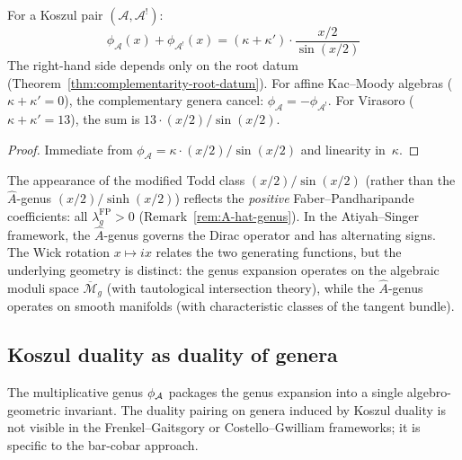 \begin{corollary}
\label{cor:complementary-genera}
For a Koszul pair $(\mathcal{A}, \mathcal{A}^!)$:
\begin{equation}\label{eq:genus-complementarity}
\phi_{\mathcal{A}}(x) + \phi_{\mathcal{A}^!}(x) = (\kappa + \kappa') \cdot \frac{x/2}{\sin(x/2)}
\end{equation}
The right-hand side depends only on the root datum \textup{(}Theorem~\textup{\ref{thm:complementarity-root-datum})}.  For affine Kac--Moody algebras \textup{(}$\kappa + \kappa' = 0$\textup{)}, the complementary genera cancel: $\phi_{\mathcal{A}} = -\phi_{\mathcal{A}^!}$.  For Virasoro \textup{(}$\kappa + \kappa' = 13$\textup{)}, the sum is $13 \cdot (x/2)/\sin(x/2)$.
\end{corollary}

\begin{proof}
Immediate from $\phi_{\mathcal{A}} = \kappa \cdot (x/2)/\sin(x/2)$ and linearity in~$\kappa$.
\end{proof}

\begin{remark}\label{rem:genus-index-theory}
The appearance of the modified Todd class $(x/2)/\sin(x/2)$ (rather than the $\hat{A}$-genus $(x/2)/\sinh(x/2)$) reflects the \emph{positive} Faber--Pandharipande coefficients: all $\lambda_g^{\mathrm{FP}} > 0$ (Remark~\ref{rem:A-hat-genus}).  In the Atiyah--Singer framework, the $\hat{A}$-genus governs the Dirac operator and has alternating signs.  The Wick rotation $x \mapsto ix$ relates the two generating functions, but the underlying geometry is distinct: the genus expansion operates on the algebraic moduli space $\overline{\mathcal{M}}_g$ (with tautological intersection theory), while the $\hat{A}$-genus operates on smooth manifolds (with characteristic classes of the tangent bundle).
\end{remark}

\subsection{Koszul duality as duality of genera}\label{subsec:koszul-genera-duality}

The multiplicative genus $\phi_{\mathcal{A}}$ packages the genus expansion into a single
algebro-geometric invariant.  The duality pairing on genera induced by Koszul duality is not visible in the Frenkel--Gaitsgory or Costello--Gwilliam frameworks; it is specific to the bar-cobar approach.

